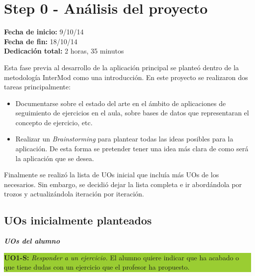 
\section{Step 0 - Análisis del proyecto}
\label{step0}

\begin{flushleft}
\textbf{Fecha de inicio:} 9/10/14\\
\textbf{Fecha de fin:} 18/10/14\\
\textbf{Dedicación total:} 2 horas, 35 minutos\\
\end{flushleft}

Esta fase previa al desarrollo de la aplicación principal se planteó dentro de la metodología InterMod como una introducción. En este proyecto se realizaron dos tareas principalmente:

\begin{itemize}
\item Documentarse sobre el estado del arte en el ámbito de aplicaciones de seguimiento de ejercicios en el aula, sobre bases de datos que representaran el concepto de ejercicio, etc.
\item Realizar un \textit{Brainstorming} para plantear todas las ideas posibles para la aplicación. De esta forma se pretender tener una idea más clara de como será la aplicación que se desea.
\end{itemize}

Finalmente se realizó la lista de UOs inicial que incluía más UOs de los necesarios. Sin embargo, se decidió dejar la lista completa e ir abordándola por trozos y actualizándola iteración por iteración.\\

\subsection{UOs inicialmente planteados}
\label{step0:uos}

\textbf\textit{\large UOs del alumno}\\

\colorbox{YellowGreen}{\parbox[c]{1.0\textwidth}{
	\textbf{UO1-S:} \textit{Responder a un ejercicio.} El alumno quiere indicar que ha acabado o que tiene dudas con 			un ejercicio que el profesor ha propuesto.\\
}}\\

